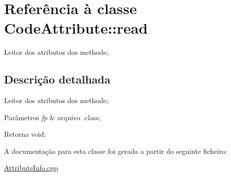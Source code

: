 \hypertarget{class_code_attribute_1_1read}{}\section{Referência à classe Code\+Attribute\+:\+:read}
\label{class_code_attribute_1_1read}


Leitor dos atributos dos methods;.  




\subsection{Descrição detalhada}
Leitor dos atributos dos methods;. 


\begin{DoxyParams}{Parâmetros}
{\em fp} & arquivo .class; \\
\hline
\end{DoxyParams}
\begin{DoxyReturn}{Retorna}
void; 
\end{DoxyReturn}


A documentação para esta classe foi gerada a partir do seguinte ficheiro\+:\begin{DoxyCompactItemize}
\item 
\hyperlink{_attribute_info_8cpp}{Attribute\+Info.\+cpp}\end{DoxyCompactItemize}
